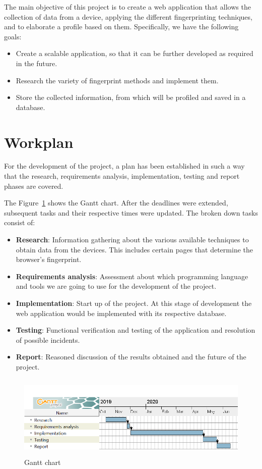 The main objective of this project is to create a web application that allows the collection of data from a device, applying the different fingerprinting techniques, and to elaborate a profile based on them. Specifically, we have the following goals:
\begin{itemize}
    \item Create a scalable application, so that it can be further developed as required in the future.
    \item Research the variety of fingerprint methods and implement them.
    \item Store the collected information, from which will be profiled and saved in a database.
\end{itemize}

\section{Workplan}
For the development of the project, a plan has been established in such a way that the research, requirements analysis, implementation, testing and report phases are covered. \par
The Figure~\ref{fig:diagramaGantten} shows the Gantt chart. After the deadlines were extended, subsequent tasks and their respective times were updated. The broken down tasks consist of:
\begin{itemize}
    \item \textbf{Research}: Information gathering about the various available techniques to obtain data from the devices. This includes certain pages that determine the browser's fingerprint\cite{amiunique}.
    \item \textbf{Requirements analysis}: Assessment about which programming language and tools we are going to use for the development of the project.
    \item \textbf{Implementation}: Start up of the project. At this stage of development the web application would be implemented with its respective database.
    \item \textbf{Testing}: Functional verification and testing of the application and resolution of possible incidents.
    \item \textbf{Report}: Reasoned discussion of the results obtained and the future of the project.
\end{itemize}
\begin{figure}[b]
    \includegraphics[width=1\textwidth, height=4cm]{Images/diagramaGantten.png}
    \caption{Gantt chart}
    \label{fig:diagramaGantten}
\end{figure}


